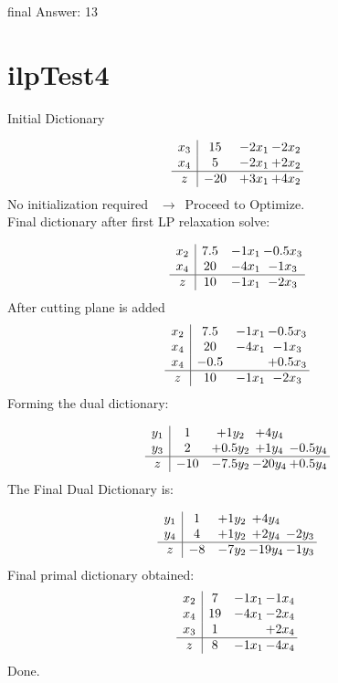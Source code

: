 \documentclass[11pt]{article}
\begin{document}
final Answer: 13

\section{ilpTest4}

Initial Dictionary 

\[\begin{array}{c| c c@{\hskip 2pt} c@{\hskip 2pt} }
 x_{3}   &  15 & -2 x_{1} & -2 x_{2}\\
 x_{4}   &  5 & -2 x_{1} & + 2 x_{2}\\
\hline
z    &  -20 & + 3 x_{1} & + 4 x_{2}\\
\end{array}\]
No initialization required \ $\rightarrow$\  Proceed to Optimize. \\ 
Final dictionary after first LP relaxation solve: 

\[\begin{array}{c| c c@{\hskip 2pt} c@{\hskip 2pt} }
 x_{2}   &  7.5 & -1 x_{1} & -0.5 x_{3}\\
 x_{4}   &  20 & -4 x_{1} & -1 x_{3}\\
\hline
z    &  10 & -1 x_{1} & -2 x_{3}\\
\end{array}\]
 After cutting plane is added 
\[\begin{array}{c| c c@{\hskip 2pt} c@{\hskip 2pt} }
 x_{2}   &  7.5 & -1 x_{1} & -0.5 x_{3}\\
 x_{4}   &  20 & -4 x_{1} & -1 x_{3}\\
 x_{4}   &  -0.5  &   & + 0.5 x_{3}\\
\hline
z    &  10 & -1 x_{1} & -2 x_{3}\\
\end{array}\]
Forming the dual dictionary:

\[\begin{array}{c| c c@{\hskip 2pt} c@{\hskip 2pt} c@{\hskip 2pt} }
 y_{1}   &  1 & + 1 y_{2} & + 4 y_{4} &   \\
 y_{3}   &  2 & + 0.5 y_{2} & + 1 y_{4} & -0.5 y_{4}\\
\hline
z    &  -10 & -7.5 y_{2} & -20 y_{4} & + 0.5 y_{4}\\
\end{array}\]
The Final Dual Dictionary is: 

\[\begin{array}{c| c c@{\hskip 2pt} c@{\hskip 2pt} c@{\hskip 2pt} }
 y_{1}   &  1 & + 1 y_{2} & + 4 y_{4} &   \\
 y_{4}   &  4 & + 1 y_{2} & + 2 y_{4} & -2 y_{3}\\
\hline
z    &  -8 & -7 y_{2} & -19 y_{4} & -1 y_{3}\\
\end{array}\]
 Final primal dictionary obtained: 
\[\begin{array}{c| c c@{\hskip 2pt} c@{\hskip 2pt} }
 x_{2}   &  7 & -1 x_{1} & -1 x_{4}\\
 x_{4}   &  19 & -4 x_{1} & -2 x_{4}\\
 x_{3}   &  1  &   & + 2 x_{4}\\
\hline
z    &  8 & -1 x_{1} & -4 x_{4}\\
\end{array}\]
Done.
\end{document}
